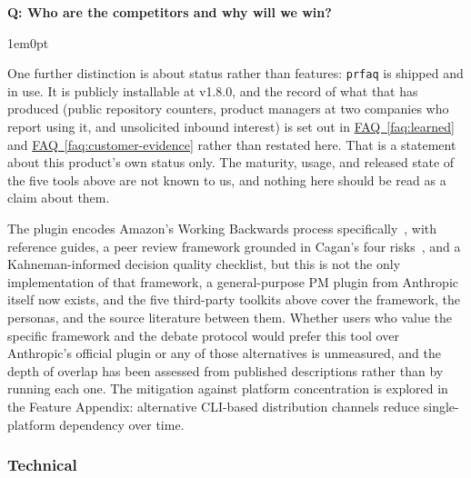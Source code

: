 \documentclass[11pt,letterpaper]{article}
\newcounter{faqnum}
\newenvironment{faqpair}[1]{%
  \needspace{4\baselineskip}%
  \vspace{0.5em}%
  \refstepcounter{faqnum}%
  \noindent\textbf{\color{SectionBlue}Q\thefaqnum: #1}\par\nopagebreak[4]%
  \vspace{0.2em}%
  \begin{adjustwidth}{1em}{0pt}%
  \setlength{\parindent}{0pt}%
}{%
  \end{adjustwidth}%
  \vspace{0.5em}%
}
\newcommand{\faqref}[1]{\hyperref[#1]{FAQ~\ref*{#1}}}
\begin{document}
\begin{faqpair}{Who are the competitors and why will we win?}
  One further distinction is about status rather than features: \texttt{prfaq} is shipped and in use. It is publicly installable at v1.8.0, and the record of what that has produced (public repository counters, product managers at two companies who report using it, and unsolicited inbound interest) is set out in \faqref{faq:learned} and \faqref{faq:customer-evidence} rather than restated here. That is a statement about this product's own status only. The maturity, usage, and released state of the five tools above are not known to us, and nothing here should be read as a claim about them.

  The plugin encodes Amazon's Working Backwards process specifically~\cite{bryar2021workingbackwards}, with reference guides, a peer review framework grounded in Cagan's four risks~\cite{cagan2018inspired}, and a Kahneman-informed decision quality checklist, but this is not the only implementation of that framework, a general-purpose PM plugin from Anthropic itself now exists, and the five third-party toolkits above cover the framework, the personas, and the source literature between them. Whether users who value the specific framework and the debate protocol would prefer this tool over Anthropic's official plugin or any of those alternatives is unmeasured, and the depth of overlap has been assessed from published descriptions rather than by running each one. The mitigation against platform concentration is explored in the Feature Appendix: alternative CLI-based distribution channels reduce single-platform dependency over time.
\end{faqpair}

\subsubsection*{Technical}
\end{document}
